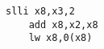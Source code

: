 \documentclass[varwidth, convert]{standalone}
\begin{document}
  \begin{BVerbatim}[gobble=4]
    slli x8,x3,2
    add x8,x2,x8
    lw x8,0(x8)
  \end{BVerbatim}
\end{document}
